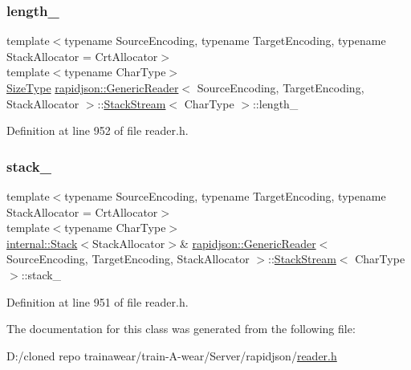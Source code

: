 \subsubsection{\texorpdfstring{length\_}{length\_}}
{\footnotesize\ttfamily template$<$typename Source\+Encoding, typename Target\+Encoding, typename Stack\+Allocator = Crt\+Allocator$>$ \\
template$<$typename Char\+Type$>$ \\
\mbox{\hyperlink{namespacerapidjson_a44eb33eaa523e36d466b1ced64b85c84}{Size\+Type}} \mbox{\hyperlink{classrapidjson_1_1_generic_reader}{rapidjson\+::\+Generic\+Reader}}$<$ Source\+Encoding, Target\+Encoding, Stack\+Allocator $>$\+::\mbox{\hyperlink{classrapidjson_1_1_generic_reader_1_1_stack_stream}{Stack\+Stream}}$<$ Char\+Type $>$\+::length\+\_\+\hspace{0.3cm}{\ttfamily [private]}}



Definition at line 952 of file reader.\+h.

\mbox{\label{classrapidjson_1_1_generic_reader_1_1_stack_stream_a9fb3b8e374497248e7b4dedd65983838}} 
\subsubsection{\texorpdfstring{stack\_}{stack\_}}
{\footnotesize\ttfamily template$<$typename Source\+Encoding, typename Target\+Encoding, typename Stack\+Allocator = Crt\+Allocator$>$ \\
template$<$typename Char\+Type$>$ \\
\mbox{\hyperlink{classrapidjson_1_1internal_1_1_stack}{internal\+::\+Stack}}$<$Stack\+Allocator$>$\& \mbox{\hyperlink{classrapidjson_1_1_generic_reader}{rapidjson\+::\+Generic\+Reader}}$<$ Source\+Encoding, Target\+Encoding, Stack\+Allocator $>$\+::\mbox{\hyperlink{classrapidjson_1_1_generic_reader_1_1_stack_stream}{Stack\+Stream}}$<$ Char\+Type $>$\+::stack\+\_\+\hspace{0.3cm}{\ttfamily [private]}}



Definition at line 951 of file reader.\+h.



The documentation for this class was generated from the following file\+:\begin{DoxyCompactItemize}
\item 
D\+:/cloned repo trainawear/train-\/\+A-\/wear/\+Server/rapidjson/\mbox{\hyperlink{reader_8h}{reader.\+h}}\end{DoxyCompactItemize}

